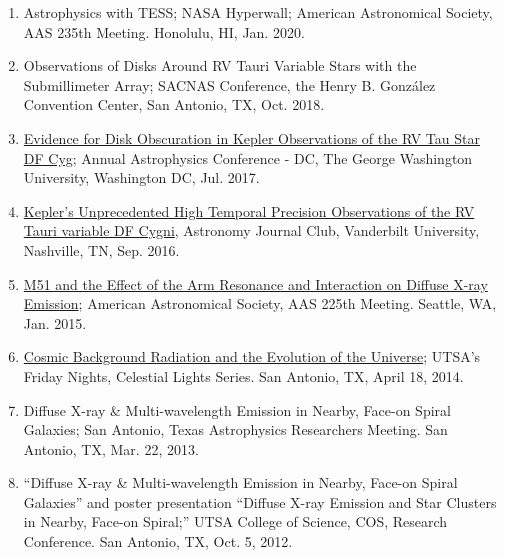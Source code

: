 \documentclass[letter,11pt]{article}
\begin{document}
\begin{enumerate}[\bfseries 1.]
\item Astrophysics with TESS; NASA Hyperwall; American Astronomical Society, AAS 235th Meeting.  Honolulu, HI, Jan. 2020.

\item Observations of Disks Around RV Tauri Variable Stars with the Submillimeter Array; SACNAS Conference, the Henry B. Gonz\'alez Convention Center, San Antonio, TX, Oct. 2018.

\item \href{https://physics.columbian.gwu.edu/sites/g/files/zaxdzs1976/f/downloads/ACDC2017_Agenda_0.pdf}{Evidence for Disk Obscuration in Kepler Observations of the RV Tau Star DF Cyg};  Annual Astrophysics Conference - DC, The George Washington University, Washington DC, Jul. 2017.

\item \href{https://as.vanderbilt.edu/astronomy/2016/08/journal-club-fall-2016/}{Kepler's Unprecedented High Temporal Precision Observations of the RV Tauri variable DF Cygni}, Astronomy Journal Club, Vanderbilt University, Nashville, TN, Sep. 2016.

\item \href{http://adsabs.harvard.edu/abs/2015AAS...22522708V}{M51 and the Effect of the Arm Resonance and Interaction on Diffuse X-ray Emission}; American Astronomical Society, AAS 225th Meeting. Seattle, WA, Jan. 2015.

\item \href{http://www.utsa.edu/today/2014/04/celestiallights4.html}{Cosmic Background Radiation and the Evolution of the Universe}; UTSA’s Friday Nights, Celestial Lights Series. San Antonio, TX, April 18, 2014.

\item Diffuse X-ray \& Multi-wavelength Emission in Nearby, Face-on Spiral Galaxies; San Antonio, Texas Astrophysics Researchers Meeting. San Antonio, TX, Mar. 22, 2013.

\item “Diffuse X-ray \& Multi-wavelength Emission in Nearby, Face-on Spiral Galaxies” and poster presentation “Diffuse X-ray Emission and Star Clusters in Nearby, Face-on Spiral;” UTSA College of Science, COS, Research Conference. San Antonio, TX, Oct. 5, 2012.

\end{enumerate}

\newpage
\end{document}
